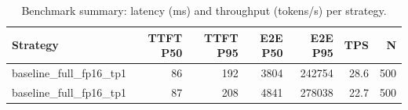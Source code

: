 \begin{table}
\caption{Benchmark summary: latency (ms) and throughput (tokens/s) per strategy.}
\label{tab:summary}
\begin{tabular}{lrrrrrr}
\toprule
Strategy & TTFT P50 & TTFT P95 & E2E P50 & E2E P95 & TPS & N \\
\midrule
baseline_full_fp16_tp1 & 86 & 192 & 3804 & 242754 & 28.6 & 500 \\
baseline_full_fp16_tp1 & 87 & 208 & 4841 & 278038 & 22.7 & 500 \\
\bottomrule
\end{tabular}
\end{table}
